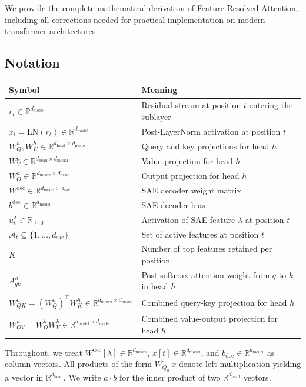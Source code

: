 \documentclass{article}
\theoremstyle{plain}
\theoremstyle{definition}
\theoremstyle{remark}
\newcommand{\Wdec}{W^{\mathrm{dec}}}
\newcommand{\WQ}{W_Q}
\newcommand{\WK}{W_K}
\newcommand{\WV}{W_V}
\newcommand{\WO}{W_O}
\newcommand{\WOV}{W_{OV}}
\newcommand{\WQK}{W_{QK}}
\newcommand{\dmodel}{d_{\mathrm{model}}}
\newcommand{\dhead}{d_{\mathrm{head}}}
\newcommand{\dsae}{d_{\mathrm{sae}}}
\newcommand{\RR}{\mathbb{R}}
\begin{document}
We provide the complete mathematical derivation of Feature-Resolved Attention, including all corrections needed for practical implementation on modern transformer architectures.

\subsection{Notation}

\begin{table}[h]
\centering
\begin{tabular}{ll}
\toprule
Symbol & Meaning \\
\midrule
$r_t \in \RR^{\dmodel}$ & Residual stream at position $t$ entering the sublayer \\
$x_t = \mathrm{LN}(r_t) \in \RR^{\dmodel}$ & Post-LayerNorm activation at position $t$ \\
$W_{Q}^h, W_{K}^h \in \RR^{\dhead \times \dmodel}$ & Query and key projections for head $h$ \\
$W_{V}^h \in \RR^{\dhead \times \dmodel}$ & Value projection for head $h$ \\
$W_{O}^h \in \RR^{\dmodel \times \dhead}$ & Output projection for head $h$ \\
$\Wdec \in \RR^{\dmodel \times \dsae}$ & SAE decoder weight matrix \\
$b^{\mathrm{dec}} \in \RR^{\dmodel}$ & SAE decoder bias \\
$u^\lambda_t \in \RR_{\geq 0}$ & Activation of SAE feature $\lambda$ at position $t$ \\
$\mathcal{A}_t \subseteq \{1, \ldots, \dsae\}$ & Set of active features at position $t$ \\
$K$ & Number of top features retained per position \\
$A^h_{qk}$ & Post-softmax attention weight from $q$ to $k$ in head $h$ \\
$\WQK^h = (\WQ^h)^\top \WK^h \in \RR^{\dmodel \times \dmodel}$ & Combined query-key projection for head $h$ \\
$\WOV^h = \WO^h \WV^h \in \RR^{\dmodel \times \dmodel}$ & Combined value-output projection for head $h$ \\
\bottomrule
\end{tabular}
\end{table}

Throughout, we treat $\Wdec[\lambda] \in \RR^{\dmodel}$, $x[t] \in \RR^{\dmodel}$, and $b_{\mathrm{dec}} \in \RR^{\dmodel}$ as column vectors. All products of the form $W_{Q_h}\,x$ denote left-multiplication yielding a vector in $\RR^{\dhead}$. We write $a \cdot b$ for the inner product of two $\RR^{\dhead}$ vectors.
\end{document}
